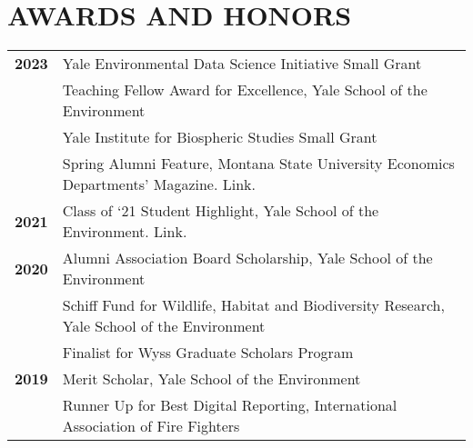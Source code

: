 \documentclass[11pt]{article}
\begin{document}
\section*{AWARDS AND HONORS}
\begin{tabularx}{\linewidth}{>{\bfseries}r X} %
2023 & Yale Environmental Data Science Initiative Small Grant \\
    & Teaching Fellow Award for Excellence, Yale School of the Environment \\
    & Yale Institute for Biospheric Studies Small Grant \\
    & Spring Alumni Feature, Montana State University Economics Departments’ Magazine. Link. \\[1ex]
2021 & Class of ‘21 Student Highlight, Yale School of the Environment. Link. \\[1ex]
2020 & Alumni Association Board Scholarship, Yale School of the Environment \\
    & Schiff Fund for Wildlife, Habitat and Biodiversity Research, Yale School of the Environment \\
    & Finalist for Wyss Graduate Scholars Program \\[1ex]
2019 & Merit Scholar, Yale School of the Environment \\
    & Runner Up for Best Digital Reporting, International Association of Fire Fighters \\[1ex]

\end{tabularx}
\end{document}
